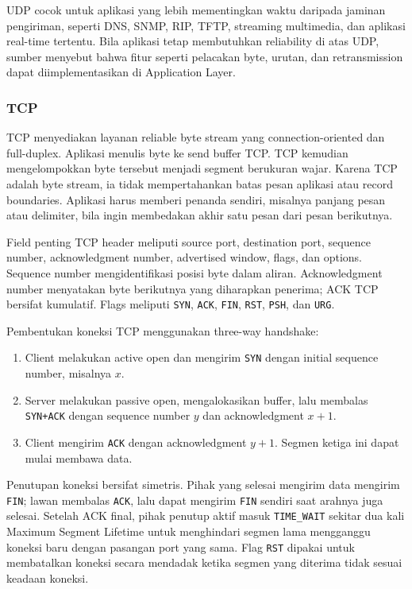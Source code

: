 UDP cocok untuk aplikasi yang lebih mementingkan waktu daripada jaminan pengiriman, seperti DNS, SNMP, RIP, TFTP, streaming multimedia, dan aplikasi real-time tertentu. Bila aplikasi tetap membutuhkan reliability di atas UDP, sumber menyebut bahwa fitur seperti pelacakan byte, urutan, dan retransmission dapat diimplementasikan di Application Layer.

\subsubsection*{TCP}

TCP menyediakan layanan reliable byte stream yang connection-oriented dan full-duplex. Aplikasi menulis byte ke send buffer TCP. TCP kemudian mengelompokkan byte tersebut menjadi segment berukuran wajar. Karena TCP adalah byte stream, ia tidak mempertahankan batas pesan aplikasi atau record boundaries. Aplikasi harus memberi penanda sendiri, misalnya panjang pesan atau delimiter, bila ingin membedakan akhir satu pesan dari pesan berikutnya.

Field penting TCP header meliputi source port, destination port, sequence number, acknowledgment number, advertised window, flags, dan options. Sequence number mengidentifikasi posisi byte dalam aliran. Acknowledgment number menyatakan byte berikutnya yang diharapkan penerima; ACK TCP bersifat kumulatif. Flags meliputi \texttt{SYN}, \texttt{ACK}, \texttt{FIN}, \texttt{RST}, \texttt{PSH}, dan \texttt{URG}.

Pembentukan koneksi TCP menggunakan three-way handshake:

\begin{enumerate}
    \item Client melakukan active open dan mengirim \texttt{SYN} dengan initial sequence number, misalnya $x$.
    \item Server melakukan passive open, mengalokasikan buffer, lalu membalas \texttt{SYN+ACK} dengan sequence number $y$ dan acknowledgment $x+1$.
    \item Client mengirim \texttt{ACK} dengan acknowledgment $y+1$. Segmen ketiga ini dapat mulai membawa data.
\end{enumerate}

Penutupan koneksi bersifat simetris. Pihak yang selesai mengirim data mengirim \texttt{FIN}; lawan membalas \texttt{ACK}, lalu dapat mengirim \texttt{FIN} sendiri saat arahnya juga selesai. Setelah ACK final, pihak penutup aktif masuk \texttt{TIME\_WAIT} sekitar dua kali Maximum Segment Lifetime untuk menghindari segmen lama mengganggu koneksi baru dengan pasangan port yang sama. Flag \texttt{RST} dipakai untuk membatalkan koneksi secara mendadak ketika segmen yang diterima tidak sesuai keadaan koneksi.

